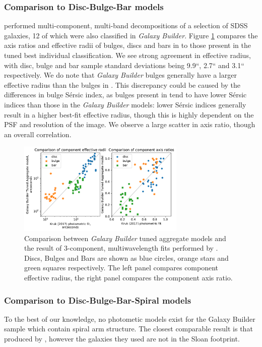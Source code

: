 \documentclass[../main.tex]{subfiles}
\begin{document}
\subsubsection{Comparison to Disc-Bulge-Bar models}

\citet{2018MNRAS.473.4731K} performed multi-component, multi-band decompositions of a selection of SDSS galaxies, 12 of which were also classified in \textit{Galaxy Builder}. Figure \ref{fig:sd_comp_comparison} compares the axis ratios and effective radii of bulges, discs and bars in \citet{2018MNRAS.473.4731K} to those present in the tuned best individual classification. We see strong agreement in effective radius, with disc, bulge and bar sample standard deviations being 9.9``, 2.7`` and 3.1`` respectively. We do note that \textit{Galaxy Builder} bulges generally have a larger effective radius than the bulges in \citet{2018MNRAS.473.4731K}. This discrepancy could be caused by the differences in bulge S\'ersic index, as bulges present in \citet{2018MNRAS.473.4731K} tend to have lower S\'ersic indices than those in the \textit{Galaxy Builder} models: lower Sérsic indices generally result in a higher best-fit effective radius, though this is highly dependent on the PSF and resolution of the image. We observe a large scatter in axis ratio, though an overall correlation.


\begin{figure}
  \includegraphics[width=8cm]{images__results/sd_comp_comparison.pdf}
  \caption{Comparison between \textit{Galaxy Builder} tuned aggregate models and the result of 3-component, multi\-wavelength fits performed by \citet{2018MNRAS.473.4731K}. Discs, Bulges and Bars are shown as blue circles, orange stars and green squares respectively. The left panel compares component effective radius, the right panel compares the component axis ratio.}
  \label{fig:sd_comp_comparison}
\end{figure}


\subsubsection{Comparison to Disc-Bulge-Bar-Spiral models}
To the best of our knowledge, no photometic models exist for the Galaxy Builder sample which contain spiral arm structure. The closest comparable result is that produced by \citet{Gao2017:1709.00746v1}, however the galaxies they used are not in the Sloan footprint.
\end{document}

